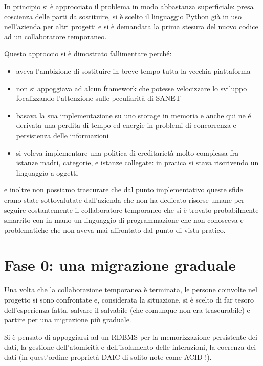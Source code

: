 \documentclass[a4wide,10pt,italian]{manual}
\begin{document}
In principio si è approcciato il problema in modo abbastanza superficiale:
presa coscienza delle parti da sostituire, si è scelto il linguaggio Python già
in uso nell'azienda per altri progetti e si è demandata la prima stesura del nuovo codice
ad un collaboratore temporaneo.

Questo approccio si è dimostrato fallimentare perché:
\begin{itemize}
\item {} 
aveva l'ambizione di sostituire in breve tempo tutta la vecchia piattaforma

\item {} 
non si appoggiava ad alcun framework che potesse velocizzare lo sviluppo focalizzando l'attenzione
sulle peculiarità di SANET

\item {} 
basava la sua implementazione su uno storage in memoria e anche qui ne é derivata una perdita di tempo
ed energie in problemi di concorrenza e persistenza delle informazioni

\item {} 
si voleva implementare una politica di ereditarietà molto complessa fra istanze madri, categorie,
e istanze collegate: in pratica si stava riscrivendo un linguaggio a oggetti

\end{itemize}

e inoltre non possiamo trascurare che dal punto implementativo queste sfide erano state
sottovalutate dall'azienda che non ha dedicato risorse umane per seguire costantemente
il collaboratore temporaneo che si è trovato probabilmente smarrito con in mano un linguaggio
di programmazione che non conosceva e problematiche che non aveva mai affrontato dal punto
di vista pratico.


\section{Fase 0: una migrazione graduale}

Una volta che la collaborazione temporanea è terminata, le persone coinvolte nel progetto
si sono confrontate e, considerata la situazione, si è scelto di far tesoro dell'esperienza
fatta, salvare il salvabile (che comunque non era trascurabile) e partire per una migrazione
più graduale.

Si è pensato di appoggiarsi ad un RDBMS per la memorizzazione persistente dei dati, la gestione
dell'atomicità e dell'isolamento delle interazioni, la coerenza dei dati (in quest'ordine
proprietà DAIC di solito note come ACID !).
\end{document}
